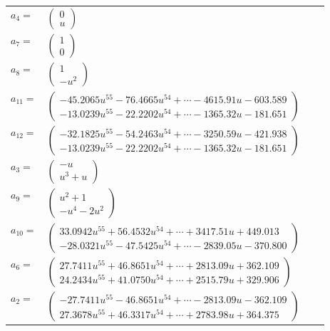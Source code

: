 \documentclass[1p]{elsarticle_modified}
\theoremstyle{definition}
\begin{document}
\begin{tabular}{m{7pt} m{180pt} m{7pt} m{180pt} }
\flushright $a_{4}=$&$\begin{pmatrix}0\\u\end{pmatrix}$ \\
\flushright $a_{7}=$&$\begin{pmatrix}1\\0\end{pmatrix}$ \\
\flushright $a_{8}=$&$\begin{pmatrix}1\\- u^2\end{pmatrix}$ \\
\flushright $a_{11}=$&$\begin{pmatrix}-45.2065 u^{55}-76.4665 u^{54}+\cdots-4615.91 u-603.589\\-13.0239 u^{55}-22.2202 u^{54}+\cdots-1365.32 u-181.651\end{pmatrix}$ \\
\flushright $a_{12}=$&$\begin{pmatrix}-32.1825 u^{55}-54.2463 u^{54}+\cdots-3250.59 u-421.938\\-13.0239 u^{55}-22.2202 u^{54}+\cdots-1365.32 u-181.651\end{pmatrix}$ \\
\flushright $a_{3}=$&$\begin{pmatrix}- u\\u^3+u\end{pmatrix}$ \\
\flushright $a_{9}=$&$\begin{pmatrix}u^2+1\\- u^4-2 u^2\end{pmatrix}$ \\
\flushright $a_{10}=$&$\begin{pmatrix}33.0942 u^{55}+56.4532 u^{54}+\cdots+3417.51 u+449.013\\-28.0321 u^{55}-47.5425 u^{54}+\cdots-2839.05 u-370.800\end{pmatrix}$ \\
\flushright $a_{6}=$&$\begin{pmatrix}27.7411 u^{55}+46.8651 u^{54}+\cdots+2813.09 u+362.109\\24.2434 u^{55}+41.0750 u^{54}+\cdots+2515.79 u+329.906\end{pmatrix}$ \\
\flushright $a_{2}=$&$\begin{pmatrix}-27.7411 u^{55}-46.8651 u^{54}+\cdots-2813.09 u-362.109\\27.3678 u^{55}+46.3317 u^{54}+\cdots+2783.98 u+364.375\end{pmatrix}$ \\

\end{tabular}
\end{document}
